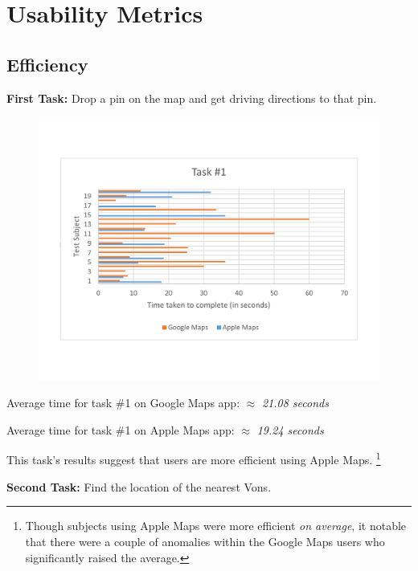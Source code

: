 \documentclass[a4paper; 11pt]{article}
\begin{document}
\section{Usability Metrics}
\subsection{Efficiency}
\par
\textbf{First Task: }Drop a pin on the map and get driving directions to that pin.
\vspace{-.4in}
\begin{figure}[ht]
\begin{center}
\vspace{-.1in}
\includegraphics[keepaspectratio, width=.8\textwidth ]{task1.pdf}
\end{center}
\end{figure}
\begin{center}
\vspace{-.6in}
\par
Average time for task \#1 on Google Maps app: $ \approx $ \textit{21.08 seconds}
\par
Average time for task \#1 on Apple Maps app: $ \approx $ \textit{19.24 seconds}
\end{center}
\par
\noindent
This task's results suggest that users are more efficient using Apple Maps. \footnote{Though subjects using Apple Maps were more efficient \textit{on average}, it notable that there were a couple of anomalies within the Google Maps users who significantly raised the average.}
\medskip
\medskip
\par
\noindent
\textbf{Second Task: }Find the location of the nearest Vons.
\end{document}

